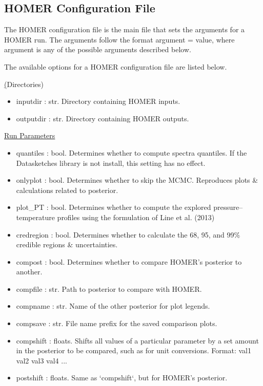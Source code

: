 \documentclass[letterpaper, 12pt]{article}
\begin{document}
\subsection{HOMER Configuration File}
\label{sec:config}
The HOMER configuration file is the main file that sets the arguments for a 
HOMER run. The arguments follow the format {\ttb argument = value}, where 
{\ttb argument} is any of the possible arguments described below. 

\noindent The available options for a HOMER configuration file are listed below.

\noindent \underline(Directories)
\begin{itemize}
\item inputdir   : str.  Directory containing HOMER inputs.
\item outputdir  : str.  Directory containing HOMER outputs.
\end{itemize}

\noindent \underline{Run Parameters}
\begin{itemize}
\item quantiles   : bool. Determines whether to compute spectra quantiles.
                    If the Datasketches library is not install, this setting 
                    has no effect.
\item onlyplot    : bool. Determines whether to skip the MCMC.
                    Reproduces plots \& calculations related to posterior.
\item plot\_PT    : bool. Determines whether to compute the explored 
                    pressure--temperature profiles using the formulation of 
                    Line et al. (2013)
\item credregion  : bool. Determines whether to calculate the 68, 95, and 99\% 
                    credible regions \& uncertainties.
\item compost     : bool. Determines whether to compare HOMER's posterior to 
                          another.
\item compfile    : str.  Path to posterior to compare with HOMER.
\item compname    : str.  Name of the other posterior for plot legends.
\item compsave    : str.  File name prefix for the saved comparison plots.
\item compshift   : floats. Shifts all values of a particular parameter by a 
                          set amount in the posterior to be compared, such as 
                          for unit conversions.
                    Format: val1 val2 val3 val4 ...
\item postshift   : floats. Same as `compshift`, but for HOMER's posterior.
\end{itemize}
\end{document}
